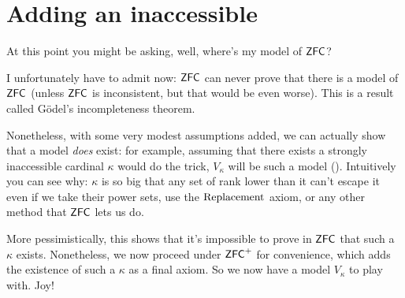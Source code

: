 \section{Adding an inaccessible}
At this point you might be asking, well, where's my model of $\mathsf{ZFC}$?

I unfortunately have to admit now: $\mathsf{ZFC}$ can never prove that there is a model of $\mathsf{ZFC}$
(unless $\mathsf{ZFC}$ is inconsistent, but that would be even worse).
This is a result called G\"odel's incompleteness theorem.

Nonetheless, with some very modest assumptions added,
we can actually show that a model \emph{does} exist:
for example, assuming that there exists a strongly inaccessible cardinal $\kappa$ would do the trick,
$V_\kappa$ will be such a model ().
Intuitively you can see why: $\kappa$ is so big that any set of rank lower than it can't escape it
even if we take their power sets, use the $\mathrm{Replacement}$ axiom,
or any other method that $\mathsf{ZFC}$ lets us do.

More pessimistically,
this shows that it's impossible to prove in $\mathsf{ZFC}$ that such a $\kappa$ exists.
Nonetheless, we now proceed under $\mathsf{ZFC}^+$ for convenience,
which adds the existence of such a $\kappa$
as a final axiom.
So we now have a model $V_\kappa$ to play with. Joy!

